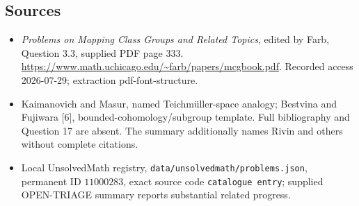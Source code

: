\documentclass[11pt]{article}
\begin{document}
\subsection{Sources}
\begin{itemize}
\item \emph{Problems on Mapping Class Groups and Related Topics}, edited by Farb, Question 3.3, supplied PDF page 333. \url{https://www.math.uchicago.edu/~farb/papers/mcgbook.pdf}. Recorded access 2026-07-29; extraction pdf-font-structure.
\item Kaimanovich and Masur, named Teichm\"uller-space analogy; Bestvina and Fujiwara [6], bounded-cohomology/subgroup template. Full bibliography and Question 17 are absent. The summary additionally names Rivin and others without complete citations.
\item Local UnsolvedMath registry, \texttt{data/unsolvedmath/problems.json}, permanent ID \(11000283\), exact source code \texttt{catalogue entry}; supplied OPEN-TRIAGE summary reports substantial related progress.
\end{itemize}
\end{document}

